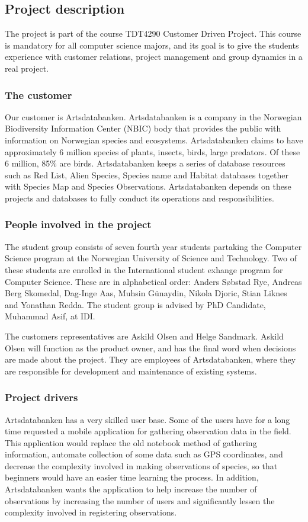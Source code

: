 \subsection{Project description}
The project is part of the course TDT4290 Customer Driven Project. This course is mandatory for all computer science majors, and its goal is to give the students experience with customer relations, project management and group dynamics in a real project.

\subsubsection{The customer}
Our customer is Artsdatabanken. Artsdatabanken is a company in the
Norwegian Biodiversity Information Center (NBIC) body that provides the
public with information on Norwegian species and ecosystems.
Artsdatabanken claims to have approximately 6 million species of plants,
insects, birds, large predators. Of these 6 million, 85\% are birds. 
Artsdatabanken keeps a series of database resources such as Red List,
Alien Species, Species name and Habitat databases together with Species
Map and Species Observations. Artsdatabanken depends on these projects
and databases to fully conduct its operations and
responsibilities.\cite{artsdatabanken:about} 

\subsubsection{People involved in the project}
The student group consists of seven fourth year students partaking the Computer Science program at the Norwegian University of Science and Technology. Two of these students are enrolled in the International student exhange program for Computer Science. These are in alphabetical order: Anders Søbstad Rye, Andreas Berg Skomedal, Dag-Inge Aas, Muhsin Günaydin, Nikola Djoric, Stian Liknes and Yonathan Redda. The student group is advised by PhD Candidate, Muhammad Asif, at IDI.

The customers representatives are Askild Olsen and Helge Sandmark. Askild Olsen will function as the product owner, and has the final word when decisions are made about the project. They are employees of Artsdatabanken, where they are responsible for development and maintenance of existing systems.

\subsubsection{Project drivers}
Artsdatabanken has a very skilled user base. Some of the users have for a long
time requested a mobile application for gathering observation data in the
field. This application would replace the old notebook method of gathering
information, automate collection of some data such as GPS coordinates, and
decrease the complexity involved in making observations of species, so that
beginners would have an easier time learning the process. In addition,
Artsdatabanken wants the application to help increase the number of
observations by increasing the number of users and significantly lessen the
complexity involved in registering observations.

